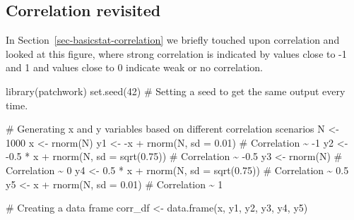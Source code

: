 \documentclass[
  letterpaper,
  DIV=11,
  numbers=noendperiod]{scrreprt}
\newenvironment{Shaded}{\begin{snugshade}}{\end{snugshade}}
\newcommand{\AttributeTok}[1]{\textcolor[rgb]{0.40,0.45,0.13}{#1}}
\newcommand{\CommentTok}[1]{\textcolor[rgb]{0.37,0.37,0.37}{#1}}
\newcommand{\DecValTok}[1]{\textcolor[rgb]{0.68,0.00,0.00}{#1}}
\newcommand{\FloatTok}[1]{\textcolor[rgb]{0.68,0.00,0.00}{#1}}
\newcommand{\FunctionTok}[1]{\textcolor[rgb]{0.28,0.35,0.67}{#1}}
\newcommand{\NormalTok}[1]{\textcolor[rgb]{0.00,0.23,0.31}{#1}}
\newcommand{\OtherTok}[1]{\textcolor[rgb]{0.00,0.23,0.31}{#1}}
\newcommand{\SpecialCharTok}[1]{\textcolor[rgb]{0.37,0.37,0.37}{#1}}
\begin{document}
\subsection{Correlation revisited}\label{correlation-revisited}

In Section~\ref{sec-basicstat-correlation} we briefly touched upon
correlation and looked at this figure, where strong correlation is
indicated by values close to -1 and 1 and values close to 0 indicate
weak or no correlation.

\begin{Shaded}
\begin{Highlighting}[]
\FunctionTok{library}\NormalTok{(patchwork)}
\FunctionTok{set.seed}\NormalTok{(}\DecValTok{42}\NormalTok{) }\CommentTok{\# Setting a seed to get the same output every time.}

\CommentTok{\# Generating x and y variables based on different correlation scenarios}
\NormalTok{N }\OtherTok{\textless{}{-}} \DecValTok{1000}
\NormalTok{x }\OtherTok{\textless{}{-}} \FunctionTok{rnorm}\NormalTok{(N)}
\NormalTok{y1 }\OtherTok{\textless{}{-}} \SpecialCharTok{{-}}\NormalTok{x }\SpecialCharTok{+} \FunctionTok{rnorm}\NormalTok{(N, }\AttributeTok{sd =} \FloatTok{0.01}\NormalTok{)  }\CommentTok{\# Correlation \textasciitilde{} {-}1}
\NormalTok{y2 }\OtherTok{\textless{}{-}} \SpecialCharTok{{-}}\FloatTok{0.5} \SpecialCharTok{*}\NormalTok{ x }\SpecialCharTok{+} \FunctionTok{rnorm}\NormalTok{(N, }\AttributeTok{sd =} \FunctionTok{sqrt}\NormalTok{(}\FloatTok{0.75}\NormalTok{))  }\CommentTok{\# Correlation \textasciitilde{} {-}0.5}
\NormalTok{y3 }\OtherTok{\textless{}{-}} \FunctionTok{rnorm}\NormalTok{(N)  }\CommentTok{\# Correlation \textasciitilde{} 0}
\NormalTok{y4 }\OtherTok{\textless{}{-}} \FloatTok{0.5} \SpecialCharTok{*}\NormalTok{ x }\SpecialCharTok{+} \FunctionTok{rnorm}\NormalTok{(N, }\AttributeTok{sd =} \FunctionTok{sqrt}\NormalTok{(}\FloatTok{0.75}\NormalTok{))  }\CommentTok{\# Correlation \textasciitilde{} 0.5}
\NormalTok{y5 }\OtherTok{\textless{}{-}}\NormalTok{ x }\SpecialCharTok{+} \FunctionTok{rnorm}\NormalTok{(N, }\AttributeTok{sd =} \FloatTok{0.01}\NormalTok{)  }\CommentTok{\# Correlation \textasciitilde{} 1}

\CommentTok{\# Creating a data frame}
\NormalTok{corr\_df }\OtherTok{\textless{}{-}} \FunctionTok{data.frame}\NormalTok{(x, y1, y2, y3, y4, y5)}


\end{Highlighting}
\end{Shaded}
\end{document}
